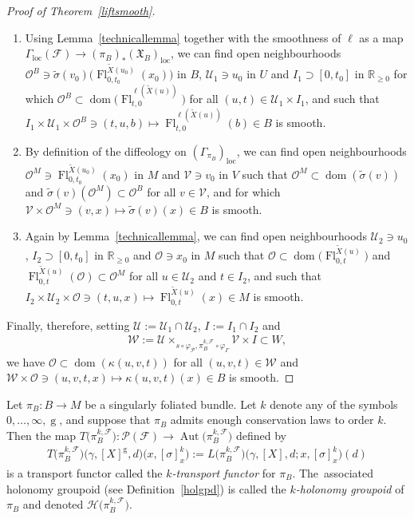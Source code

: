 \documentclass[10pt,a4paper]{amsart}
\numberwithin{equation}{section}
\def\loc{\operatorname{loc}}
\def\g{\operatorname{g}}
\def\dom{\operatorname{dom}}
\def\Aut{\operatorname{Aut}}
\def\Fl{\operatorname{Fl}}
\def\FF{{\mathcal{F}}}
\def\WW{{\mathcal{W}}}
\def\UU{{\mathcal{U}}}
\def\VV{{\mathcal{V}}}
\def\HH{{\mathcal{H}}}
\def\PP{{\mathcal{P}}}
\def\OO{{\mathcal{O}}}
\def\RB{{\mathbb{R}}}
\def\XF{{\mathfrak{X}}}
\begin{document}
\begin{proof}[Proof of Theorem~\ref{liftsmooth}]
\begin{enumerate}\itemsep=0pt
\item Using Lemma~\ref{technicallemma} together with the smoothness of $\ell$ as a map $\Gamma_{\loc}(\FF)\rightarrow(\pi_{B})_{*}(\XF_{B})_{\loc}$, we can find open neighbourhoods $\OO^{B}\ni\tilde{\sigma}(v_{0})\big(\Fl^{\tilde{X}(u_{0})}_{0,t_{0}}(x_{0})\big)$ in $B$, $\UU_{1}\ni u_{0}$ in $U$ and $I_{1}\supset[0,t_{0}]$ in $\RB_{\geq0}$ for which $\OO^{B}\subset\dom\big(\Fl^{\ell(\tilde{X}(u))}_{t,0}\big)$ for all $(u,t)\in\UU_{1}\times I_{1}$, and such that $I_{1}\times\UU_{1}\times \OO^{B}\ni(t,u,b)\mapsto\Fl^{\ell(\tilde{X}(u))}_{t,0}(b)\in B$ is smooth.
\item By definition of the diffeology on $(\Gamma_{\pi_{B}})_{\loc}$, we can find open neighbourhoods $\OO^{M}\ni\Fl^{\tilde{X}(u_{0})}_{0,t_{0}}(x_{0})$ in $M$ and $\VV\ni v_{0}$ in $V$ such that $\OO^{M}\subset\dom(\tilde{\sigma}(v))$ and $\tilde{\sigma}(v)(\OO^{M})\subset\OO^{B}$ for all $v\in\VV$, and for which $\VV\times\OO^{M}\ni(v,x)\mapsto\tilde{\sigma}(v)(x)\in B$ is smooth.
\item Again by Lemma~\ref{technicallemma}, we can find open neighbourhoods $\UU_{2}\ni u_{0}$, $I_{2}\supset[0,t_{0}]$ in $\RB_{\geq0}$ and $\OO\ni x_{0}$ in $M$ such that $\OO\subset\dom\big(\Fl^{\tilde{X}(u)}_{0,t}\big)$ and $\Fl^{\tilde{X}(u)}_{0,t}(\OO)\subset\OO^{M}$ for all $u\in\UU_{2}$ and $t\in I_{2}$, and such that $I_{2}\times\UU_{2}\times \OO\ni(t,u,x)\mapsto\Fl^{\tilde{X}(u)}_{0,t}(x)\in M$ is smooth.
\end{enumerate}
Finally, therefore, setting $\UU:=\UU_{1}\cap\UU_{2}$, $I:=I_{1}\cap I_{2}$ and
\begin{gather*}
\WW:=\UU\times_{s\circ\varphi_{\PP},\pi_{B}^{k,\FF}\circ\varphi_{\Gamma}}\VV\times I\subset W,
\end{gather*}
we have $\OO\subset\dom(\kappa(u,v,t))$ for all $(u,v,t)\in\WW$ and $\WW\times\OO\ni(u,v,t,x)\mapsto\kappa(u,v,t)(x)\in B$ is smooth.
\end{proof}


\begin{Definition}\label{transportfunctor}
Let $\pi_{B}\colon B\rightarrow M$ be a singularly foliated bundle. Let $k$ denote any of the symbols $0,\dots,\infty,\g$, and suppose that $\pi_{B}$ admits enough conservation laws to order $k$. Then the map $T\big(\pi_{B}^{k,\FF}\big)\colon \PP(\FF)\rightarrow\Aut\big(\pi_{B}^{k,\FF}\big)$ defined by
\begin{gather*}
T\big(\pi_{B}^{k,\FF}\big)\big(\gamma,[X]^{\g},d\big)\big(x,[\sigma]^{k}_{x}\big):= L\big(\pi_{B}^{k,\FF}\big)\big(\gamma,[X],d;x,[\sigma]^{k}_{x}\big)(d)
\end{gather*}
is a transport functor called the \textit{$k$-transport functor} for $\pi_{B}$. The~associated holonomy groupoid (see Definition~\ref{holgpd}) is called the \textit{$k$-holonomy groupoid} of $\pi_{B}$ and denoted $\HH\big(\pi_{B}^{k,\FF}\big)$.
\end{Definition}
\end{document}
